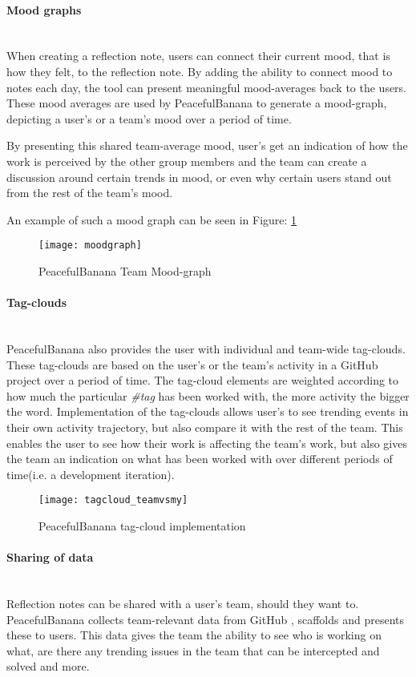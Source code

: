 \paragraph{Mood graphs}\mbox{}\\
When creating a reflection note, users can connect their current mood, that is how they felt, to the reflection note. By adding the ability to connect mood to notes each day, the tool can present meaningful mood-averages back to the users. These mood averages are used by PeacefulBanana to generate a mood-graph, depicting a user's or a team's mood over a period of time. 

By presenting this shared team-average mood, user's get an indication of how the work is perceived by the other group members and the team can create a discussion around certain trends in mood, or even why certain users stand out from the rest of the team's mood. 

An example of such a mood graph can be seen in Figure: \ref{moodgraphfunc}
\begin{figure}[H]
    \centering
        \texttt{[image: moodgraph]}
    \caption{PeacefulBanana Team Mood-graph}
    \label{moodgraphfunc}
\end{figure}
\paragraph{Tag-clouds}\mbox{}\\
PeacefulBanana also provides the user with individual and team-wide tag-clouds. These tag-clouds are based on the user's or the team's activity in a GitHub project over a period of time. The tag-cloud elements are weighted according to how much the particular \emph{\#tag} has been worked with, the more activity the bigger the word. Implementation of the tag-clouds allows user's to see trending events in their own activity trajectory, but also compare it with the rest of the team. This enables the user to see how their work is affecting the team's work, but also gives the team an indication on what has been worked with over different periods of time(i.e. a development iteration). 
\begin{figure}[H]
    \centering
        \texttt{[image: tagcloud\_teamvsmy]}
    \caption{PeacefulBanana tag-cloud implementation}
    \label{tagcloudfunc}
\end{figure}

\paragraph{Sharing of data}\mbox{}\\
Reflection notes can be shared with a user's team, should they want to.  PeacefulBanana collects team-relevant data from GitHub , scaffolds and presents these to users. This data gives the team the ability to see who is working on what, are there any trending issues in the team that can be intercepted and solved and more.  

